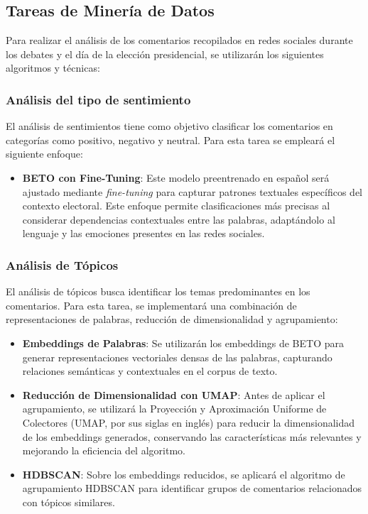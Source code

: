 \documentclass[10pt, a4paper]{article}
\begin{document}
	
	
	\subsection{Tareas de Minería de Datos}
	
	Para realizar el análisis de los comentarios recopilados en redes sociales durante los debates y el día de la elección presidencial, se utilizarán los siguientes algoritmos y técnicas:
	\vspace{-2mm}
	\subsubsection{Análisis del tipo de sentimiento}
	
	El análisis de sentimientos tiene como objetivo clasificar los comentarios en categorías como positivo, negativo y neutral. Para esta tarea se empleará el siguiente enfoque:
	
	\begin{itemize}
		\item \textbf{BETO con Fine-Tuning}: Este modelo preentrenado en español será ajustado mediante \textit{fine-tuning} para capturar patrones textuales específicos del contexto electoral. Este enfoque permite clasificaciones más precisas al considerar dependencias contextuales entre las palabras, adaptándolo al lenguaje y las emociones presentes en las redes sociales.
	\end{itemize}
	
	\vspace{-2mm}
	
	\subsubsection{Análisis de Tópicos}
	
	El análisis de tópicos busca identificar los temas predominantes en los comentarios. Para esta tarea, se implementará una combinación de representaciones de palabras, reducción de dimensionalidad y agrupamiento:
	
	\begin{itemize}
		\item \textbf{Embeddings de Palabras}: Se utilizarán los embeddings de BETO para generar representaciones vectoriales densas de las palabras, capturando relaciones semánticas y contextuales en el corpus de texto.
		\item \textbf{Reducción de Dimensionalidad con UMAP}: Antes de aplicar el agrupamiento, se utilizará la Proyección y Aproximación Uniforme de Colectores (UMAP, por sus siglas en inglés) para reducir la dimensionalidad de los embeddings generados, conservando las características más relevantes y mejorando la eficiencia del algoritmo.
		\item \textbf{HDBSCAN}: Sobre los embeddings reducidos, se aplicará el algoritmo de agrupamiento HDBSCAN para identificar grupos de comentarios relacionados con tópicos similares.
	\end{itemize}
	
\end{document}
